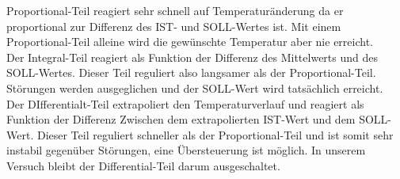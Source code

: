 \documentclass[a4paper]{scrartcl}
\begin{document}
Proportional-Teil reagiert sehr schnell auf Temperaturänderung da er proportional zur Differenz des IST- und SOLL-Wertes ist. Mit einem Proportional-Teil alleine wird die gewünschte Temperatur aber nie erreicht.\\
Der Integral-Teil reagiert als Funktion der Differenz des Mittelwerts und des SOLL-Wertes. Dieser Teil reguliert also langsamer als der Proportional-Teil. Störungen werden ausgeglichen und der SOLL-Wert wird tatsächlich erreicht.\\
Der DIfferentialt-Teil extrapoliert den Temperaturverlauf und reagiert als Funktion der Differenz Zwischen dem extrapolierten IST-Wert und dem SOLL-Wert. Dieser Teil reguliert schneller als der Proportional-Teil und ist somit sehr instabil gegenüber Störungen, eine Übersteuerung ist möglich.
In unserem Versuch bleibt der Differential-Teil darum ausgeschaltet. 
\end{document}
